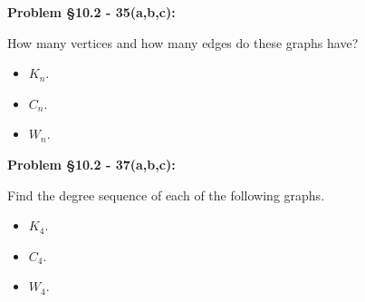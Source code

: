 \documentclass{article}
\newenvironment{problem}[1]
    {\begin{mdframed}[default]
    \textbf{Problem #1:}
    }
    {\end{mdframed}
    }
\begin{document}
\begin{problem}{\S 10.2 - 35(a,b,c)}
How many vertices and how many edges do these graphs have?
\begin{itemize}
    \item[(a)] $K_n$.
    \item[(b)] $C_n$.
    \item[(c)] $W_n$.
\end{itemize}
\end{problem}

\begin{problem}{\S 10.2 - 37(a,b,c)}
Find the degree sequence of each of the following graphs.
\begin{itemize}
    \item[(a)] $K_4$.
    \item[(b)] $C_4$.
    \item[(c)] $W_4$.
\end{itemize}
\end{problem}
\end{document}
